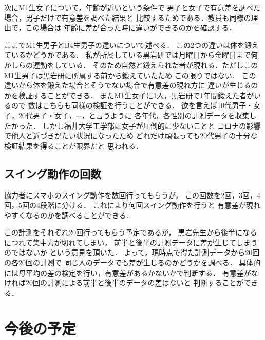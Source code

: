             次にM1生女子について，年齢が近いという条件で
            男子と女子で有意差を調べた場合，男子だけで有意差を調べた結果と
            比較するためである．教員も同様の理由で，この場合は
            年齢に差が合った時に違いができるのかを確認する．

            ここでM1生男子とB4生男子の違いについて述べる．
            この2つの違いは体を鍛えているかどうかである．
            私が所属している黒岩研では月曜日から金曜日まで何かしらの運動をしている．
            そのため自然と鍛えられた者が現れる．ただしこの
            M1生男子は黒岩研に所属する前から鍛えていたため
            この限りではない．
            この違いから体を鍛えた場合とそうでない場合で有意差の現れ方に
            違いが生じるのかを検証することができる．
            またM1生女子に1人，黒岩研で1年間鍛えた者がいるので
            数はこちらも同様の検証を行うことができる．
            欲を言えば10代男子・女子，20代男子・女子，$\cdots$，と言うように
            各年代，各性別の計測データを収集したかった．
            しかし福井大学工学部に女子が圧倒的に少ないことと
            コロナの影響で他人と近づきがたい状況になったため
            どれだけ頑張っても20代男子の十分な検証結果を得ることが限界だと
            思われる．

        \subsection{スイング動作の回数}

            協力者にスマホのスイング動作を数回行ってもらうが，
            この回数を2回，3回，4回，5回の4段階に分ける．
            これにより何回スイング動作を行うと
            有意差が現れやすくなるのかを調べることができる．

            この計測をそれぞれ20回行ってもらう予定であるが，
            黒岩先生から後半になるにつれて集中力が切れてしまい，
            前半と後半の計測データに差が生じてしまうのではないか
            という意見を頂いた．
            よって，現時点で得た計測データから20回の各20回の計測で
            同じ人のデータでも差が生じるのかどうかを調べる．
            具体的には母平均の差の検定を行い，有意差があるかないかで判断する．
            有意差がなければ20回の計測による前半と後半のデータの差はないと
            判断することができる．


    \section{今後の予定}

